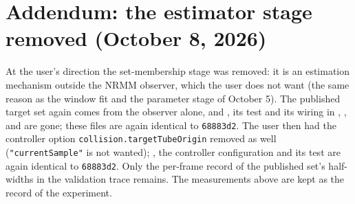 \documentclass[11pt]{article}
\begin{document}
\section{Addendum: the estimator stage removed (October 8, 2026)}
At the user's direction the set-membership stage was removed: it is an
estimation mechanism outside the NRMM observer, which the user does not want
(the same reason as the window fit and the parameter stage of October 5). The
published target set again comes from the observer alone, and
, its test and its wiring in
, ,
 and  are gone; these
files are again identical to \texttt{68883d2}. The user then had the
controller option \texttt{collision.targetTubeOrigin} removed as well
(\texttt{"currentSample"} is not wanted); ,
the controller configuration and its test are again identical to
\texttt{68883d2}. Only the per-frame record of the published set's
half-widths in the validation trace remains. The measurements above are kept
as the record of the experiment.
\end{document}
